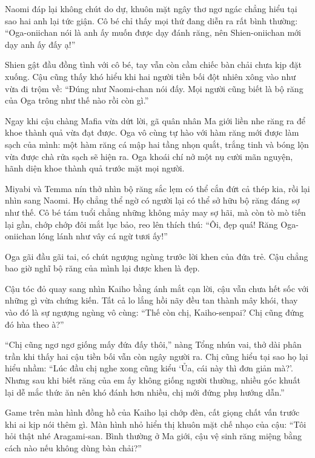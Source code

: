 \documentclass[../main.tex]{subfiles}
\begin{document}
Naomi đáp lại không chút do dự, khuôn mặt ngây thơ ngơ ngác chẳng hiểu tại sao hai anh lại tức giận. Cô bé chỉ thấy mọi thứ đang diễn ra rất bình thường: ``Oga-oniichan nói là anh ấy muốn được dạy đánh răng, nên Shien-oniichan mới dạy anh ấy đấy ạ!''

Shien gật đầu đồng tình với cô bé, tay vẫn còn cầm chiếc bàn chải chưa kịp đặt xuống. Cậu cũng thấy khó hiểu khi hai người tiền bối đột nhiên xông vào như vừa đi trộm về: ``Đúng như Naomi-chan nói đấy. Mọi người cũng biết là bộ răng của Oga trông như thế nào rồi còn gì.''

Ngay khi cậu chàng Mafia vừa dứt lời, gã quân nhân Ma giới liền nhe răng ra để khoe thành quả vừa đạt được. Oga vô cùng tự hào với hàm răng mới được làm sạch của mình: một hàm răng cá mập hai tầng nhọn quắt, trắng tinh và bóng lộn vừa được chà rửa sạch sẽ hiện ra. Oga khoái chí nở một nụ cười mãn nguyện, hãnh diện khoe thành quả trước mặt mọi người.


Miyabi và Temma nín thở nhìn bộ răng sắc lẹm có thể cắn đứt cả thép kia, rồi lại nhìn sang Naomi. Họ chẳng thể ngờ có người lại có thể sở hữu bộ răng đáng sợ như thế. Cô bé tám tuổi chẳng những không mảy may sợ hãi, mà còn tò mò tiến lại gần, chớp chớp đôi mắt lục bảo, reo lên thích thú: ``Ôi, đẹp quá! Răng Oga-oniichan lóng lánh như vây cá ngừ tươi ấy!''

Oga gãi đầu gãi tai, có chút ngượng ngùng trước lời khen của đứa trẻ. Cậu chẳng bao giờ nghĩ bộ răng của mình lại được khen là đẹp.

Cậu tóc đỏ quay sang nhìn Kaiho bằng ánh mắt cạn lời, cậu vẫn chưa hết sốc với những gì vừa chứng kiến. Tất cả lo lắng hồi nãy đều tan thành mây khói, thay vào đó là sự ngượng ngùng vô cùng: ``Thế còn chị, Kaiho-senpai? Chị cũng đứng đó hùa theo à?''

``Chị cũng ngơ ngơ giống mấy đứa đấy thôi,'' nàng Tổng nhún vai, thở dài phân trần khi thấy hai cậu tiền bối vẫn còn ngây người ra. Chị cũng hiểu tại sao họ lại hiểu nhầm: ``Lúc đầu chị nghe xong cũng kiểu `Ủa, cái này thì đơn giản mà?'. Nhưng sau khi biết răng của em ấy không giống người thường, nhiều góc khuất lại dễ mắc thức ăn nên khó đánh hơn nhiều, chị mới đứng phụ hướng dẫn.''

Game trên màn hình đồng hồ của Kaiho lại chớp đèn, cất giọng chất vấn trước khi ai kịp nói thêm gì. Màn hình nhỏ hiển thị khuôn mặt chế nhạo của cậu: ``Tôi hỏi thật nhé Aragami-san. Bình thường ở Ma giới, cậu vệ sinh răng miệng bằng cách nào nếu không dùng bàn chải?''
\end{document}
